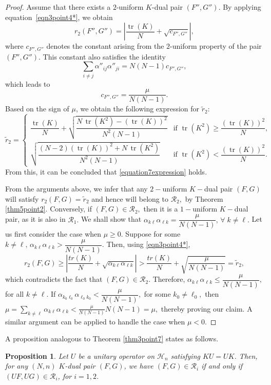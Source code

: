 \documentclass[final,1p,times]{elsarticle}
\newtheorem{prop}[thm]{Proposition}
\begin{document}
\begin{proof}
		
		\par 	Assume that there exists a $2$-uniform $K$-dual pair $(F'', G'')$. By applying equation~\eqref{eqn3point4*}, we obtain
\[
r_2(F'', G'') = \left| \dfrac{\operatorname{tr}(K)}{N} + \sqrt{c_{F'', G''}} \right|,
\]
where \( c_{F'', G''} \) denotes the constant arising from the $2$-uniform property of the pair \( (F'', G'') \). This constant also satisfies the identity
\[
\sum_{i \neq j} \alpha''_{ij} \alpha''_{ji} = N(N-1) c_{F'', G''},
\]
which leads to
\[
c_{F'', G''} = \dfrac{\mu}{N(N-1)}.
\]
Based on the sign of \( \mu \), we obtain the following expression for \( \tilde{r}_2 \):
\[
\tilde{r}_2 =
\begin{cases}
\dfrac{\operatorname{tr}(K)}{N} + \sqrt{\dfrac{N\,\operatorname{tr}(K^2) - (\operatorname{tr}(K))^2}{N^2(N-1)}} & \text{if } \operatorname{tr}(K^2) \geq \dfrac{(\operatorname{tr}(K))^2}{N}, \\[2em]
\sqrt{\dfrac{(N-2)(\operatorname{tr}(K))^2 + N\,\operatorname{tr}(K^2)}{N^2(N-1)}} & \text{if } \operatorname{tr}(K^2) < \dfrac{(\operatorname{tr}(K))^2}{N}.
\end{cases}
\]
From this, it can be concluded that \eqref{equation7expression} holds.
\par From the arguments above, we infer that any  $2-$uniform $K-$dual pair $(F,G)$ will satisfy ${r}_{2} (F,G) = \tilde{r}_{2}$ and hence will belong to $\mathcal{R}_{2},$ by Theorem \ref{thm5point2}.	 Conversely, if $(F,G) \in \mathcal{R}_{2},$ then it is a $1-$uniform $K-$dual pair, as it is also in $\mathcal{R}_{1}.$ We shall show that $\alpha_{k\ell}\alpha_{\ell k} = \dfrac{\mu}{N(N-1)},\,\forall\;k \neq \ell.$ Let us first consider the case when  $\mu \geq 0.$ Suppose for some $k \neq \ell,\, \alpha_{k\ell}\alpha_{\ell k} >  \dfrac{\mu}{N(N-1)}.$ Then, using \eqref{eqn3point4*},
		$${r}_{2} (F,G) \geq  \left| \dfrac{tr(K)}{N}+ \sqrt{ \alpha_{k\ell}\alpha_{\ell k}}   \right| > \dfrac{tr(K)}{N} + \sqrt{ \frac{\mu}{N(N-1)}} = \tilde{r}_{2},$$
		which contradicts the fact that $(F,G) \in \mathcal{R}_{2}.$ Therefore, $ \alpha_{k\ell}\alpha_{\ell k} \leq \dfrac{\mu}{N(N-1)},$	for all $k \neq \ell. $ If $\alpha_{k_0 \ell_0}\alpha_{\ell_0 k_0} < \dfrac{\mu}{N(N-1)},$ for some $k_0 \neq \ell_0,$ then $\mu =\displaystyle{\sum_{k \neq \ell}\alpha_{k \ell}\alpha_{\ell k} < \frac{\mu}{N(N-1)} N(N-1)} = \mu,$ thereby proving our claim. A similar argument can be applied to handle the case when \( \mu < 0 \).
	\end{proof}
	
	\noindent A proposition analogous to Theorem \ref{thm3point7} states as follows.
	\begin{prop}
Let \( U \) be a unitary operator on \( \mathcal{H}_n \) satisfying \( KU = UK \). Then, for any \((N,n)\) \( K \)-dual pair \( (F, G) \), we have \( (F, G) \in \mathcal{R}_i \) if and only if \( (UF, UG) \in \mathcal{R}_i \), for \( i = 1, 2 \).
\end{prop}
\end{document}
